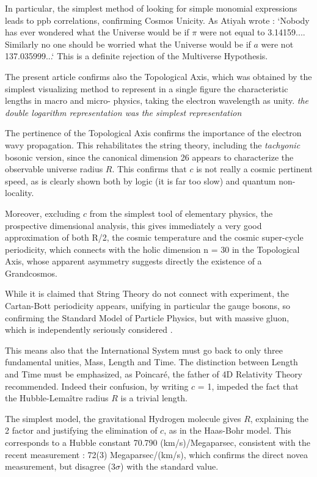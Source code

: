 \documentclass[twoside,draft]{article}
\begin{document}
\begin{sloppypar}
{In particular, the simplest method of looking for simple monomial expressions leads to ppb correlations, confirming Cosmos Unicity. As Atiyah wrote \cite{Koide}: `Nobody has
ever wondered what the Universe would be if $\pi$ were not equal to 3.14159.... Similarly no one
should be worried what the Universe would be if $a$ were not 137.035999...` This is a definite
rejection of the Multiverse Hypothesis.

The present article confirms also the Topological Axis, which was obtained by the simplest
visualizing method to represent in a single figure the characteristic lengths in macro and micro-
physics, taking the electron wavelength as unity. \textit {the double logarithm representation was the simplest representation}

The pertinence of the Topological Axis confirms
the importance of the electron wavy propagation. This rehabilitates the string theory, including the
\textit{tachyonic} bosonic version, since the canonical dimension 26 appears to characterize the observable
universe radius $R$. This confirms that $c$ is not really a cosmic pertinent speed, as is clearly shown both by
logic (it is far too slow) and quantum non-locality.

Moreover, excluding $c$ from the simplest tool of elementary physics, the prospective dimensional
analysis, this gives immediately a very good approximation of both R/2, the cosmic temperature and the cosmic super-cycle periodicity, which connects with the holic dimension n = 30 in the
Topological Axis, whose apparent asymmetry suggests directly the existence of a Grandcosmos.

While it is claimed that String Theory do not connect with experiment, the Cartan-Bott periodicity
appears, unifying in particular the gauge bosons, so confirming the Standard Model of Particle Physics, but with
massive gluon, which is independently seriously considered \cite{Salingaros}.

This means also that the International System must go back to only three fundamental unities,
Mass, Length and Time. The distinction between Length and Time must be emphasized, as
Poincar\'{e}, the father of 4D Relativity Theory recommended. Indeed their confusion, by writing $c$ =
1, impeded the fact that the Hubble-Lema\^{i}tre radius $R$ is a trivial length.

The simplest model, the gravitational Hydrogen molecule gives $R$, explaining the 2 factor and
justifying the elimination of $c$, as in the Haas-Bohr model. This corresponds to a Hubble constant 70.790
(km/s)/Megaparsec, consistent with the recent measurement \cite{Bonvin}: 72(3) Megaparsec/(km/s), which
confirms the direct novea measurement, but disagree (3$\sigma$) with the standard value.

}
\end{sloppypar}
\end{document}
